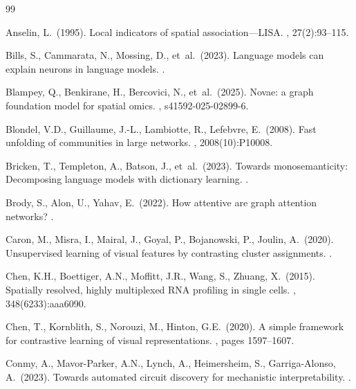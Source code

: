 \documentclass[11pt]{article}
\begin{document}

\begin{thebibliography}{99}

Anselin, L.\ (1995).
\newblock Local indicators of spatial association---LISA.
, 27(2):93--115.


Bills, S., Cammarata, N., Mossing, D., et~al.\ (2023).
\newblock Language models can explain neurons in language models.
.

Blampey, Q., Benkirane, H., Bercovici, N., et~al.\ (2025).
\newblock Novae: a graph foundation model for spatial omics.
, s41592-025-02899-6.

Blondel, V.D., Guillaume, J.-L., Lambiotte, R., Lefebvre, E.\ (2008).
\newblock Fast unfolding of communities in large networks.
, 2008(10):P10008.

Bricken, T., Templeton, A., Batson, J., et~al.\ (2023).
\newblock Towards monosemanticity: Decomposing language models with
  dictionary learning.
.

Brody, S., Alon, U., Yahav, E.\ (2022).
\newblock How attentive are graph attention networks?
.

Caron, M., Misra, I., Mairal, J., Goyal, P., Bojanowski, P., Joulin, A.\ (2020).
\newblock Unsupervised learning of visual features by contrasting cluster
  assignments.
.

Chen, K.H., Boettiger, A.N., Moffitt, J.R., Wang, S., Zhuang, X.\ (2015).
\newblock Spatially resolved, highly multiplexed RNA profiling in single
  cells.
, 348(6233):aaa6090.

Chen, T., Kornblith, S., Norouzi, M., Hinton, G.E.\ (2020).
\newblock A simple framework for contrastive learning of visual representations.
, pages 1597--1607.

Conmy, A., Mavor-Parker, A.N., Lynch, A., Heimersheim, S., Garriga-Alonso, A.\ (2023).
\newblock Towards automated circuit discovery for mechanistic interpretability.
.


\end{thebibliography}
\end{document}
